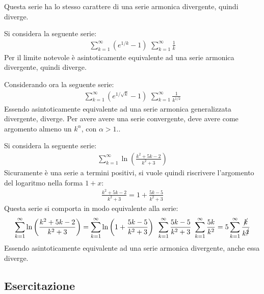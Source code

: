 \documentclass{article}
\numberwithin{equation}{subsection}
\begin{document}
Questa serie ha lo stesso carattere di una serie armonica divergente, quindi diverge. 

Si considera la seguente serie:
\begin{gather*}
    \displaystyle\sum_{k=1}^\infty\left(e^{1/k}-1\right)\mbox{~}\sum_{k=1}^\infty\frac{1}{k}
\end{gather*}
Per il limite notevole è asintoticamente equivalente ad una serie armonica divergente, quindi diverge. 

Considerando ora la seguente serie:
\begin{gather*}
    \displaystyle\sum_{k=1}^\infty\left(e^{1/\sqrt{k}}-1\right)\mbox{~}\sum_{k=1}^\infty\frac{1}{k^{1/2}}
\end{gather*}
Essendo asintoticamente equivalente ad una serie armonica generalizzata divergente, diverge. 
Per avere avere una serie convergente, deve avere come argomento almeno un $k^\alpha$, con $\alpha>1$.. 


Si considera la seguente serie:
\begin{gather*}
    \displaystyle\sum_{k=1}^\infty\ln\left(\frac{k^2+5k-2}{k^2+3}\right)
\end{gather*}
Sicuramente è una serie a termini positivi, si vuole quindi riscrivere l'argomento del logaritmo nella forma $1+x$:
\begin{gather*}
    \displaystyle\frac{k^2+5k-2}{k^2+3}=1+\frac{5k-5}{k^2+3}
\end{gather*}
Questa serie si comporta in modo equivalente alla serie:
\begin{gather*}
    \displaystyle\sum_{k=1}^\infty\ln\left(\frac{k^2+5k-2}{k^2+3}\right)=
    \displaystyle\sum_{k=1}^\infty\ln\left(1+\frac{5k-5}{k^2+3}\right)\mbox{~}\sum_{k=1}^\infty\frac{5k-5}{k^2+3}\mbox{~}\sum_{k=1}^\infty\frac{5k}{k^2}=5\sum_{k=1}^\infty\frac{\cancel{k}}{k^{\cancel{2}}}
\end{gather*}
Essendo asintoticamente equivalente ad una serie armonica divergente, anche essa diverge. 

\subsection*{Esercitazione}
\end{document}
